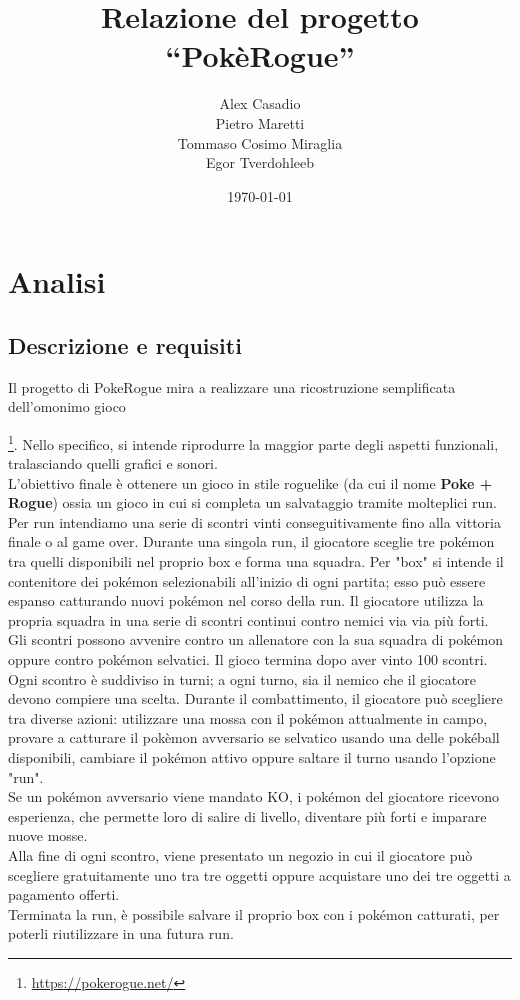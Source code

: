 \documentclass[a4paper,12pt]{report}
\title{Relazione del progetto\\``PokèRogue''}
\author{Alex Casadio\\Pietro Maretti \\Tommaso Cosimo Miraglia \\ Egor Tverdohleeb}
\date{\today}
\begin{document}
\maketitle


\tableofcontents

\chapter{Analisi}

\section{Descrizione e requisiti}

Il progetto di PokeRogue mira a realizzare una ricostruzione semplificata dell'{omonimo gioco}{\footnote{\url{https://pokerogue.net/}}. Nello specifico, si intende riprodurre la maggior parte degli aspetti funzionali, tralasciando quelli grafici e sonori.\\
L'obiettivo finale è ottenere un gioco in stile roguelike (da cui il nome \textbf{Poke + Rogue}) ossia un gioco in cui si completa un salvataggio tramite molteplici run. Per run intendiamo una serie di scontri vinti conseguitivamente fino alla vittoria finale o al game over.
Durante una singola run, il giocatore sceglie tre pokémon tra quelli disponibili nel proprio box e forma una squadra. Per "box" si intende il contenitore dei pokémon selezionabili all'inizio di ogni partita; esso può essere espanso catturando nuovi pokémon nel corso della run. Il giocatore utilizza la propria squadra in una serie di scontri continui contro nemici via via più forti.\\
Gli scontri possono avvenire contro un allenatore con la sua squadra di pokémon oppure contro pokémon selvatici. Il gioco termina dopo aver vinto 100 scontri.\\
Ogni scontro è suddiviso in turni; a ogni turno, sia il nemico che il giocatore devono compiere una scelta. Durante il combattimento, il giocatore può scegliere tra diverse azioni: utilizzare una mossa con il pokémon attualmente in campo, provare a catturare il pokèmon avversario se selvatico usando una delle pokéball disponibili, cambiare il pokémon attivo oppure saltare il turno usando l'opzione "run".\\
Se un pokémon avversario viene mandato KO, i pokémon del giocatore ricevono esperienza, che permette loro di salire di livello, diventare più forti e imparare nuove mosse.\\
Alla fine di ogni scontro, viene presentato un negozio in cui il giocatore può scegliere gratuitamente uno tra tre oggetti oppure acquistare uno dei tre oggetti a pagamento offerti.\\
Terminata la run, è possibile salvare il proprio box con i pokémon catturati, per poterli riutilizzare in una futura run.



}
\end{document}

